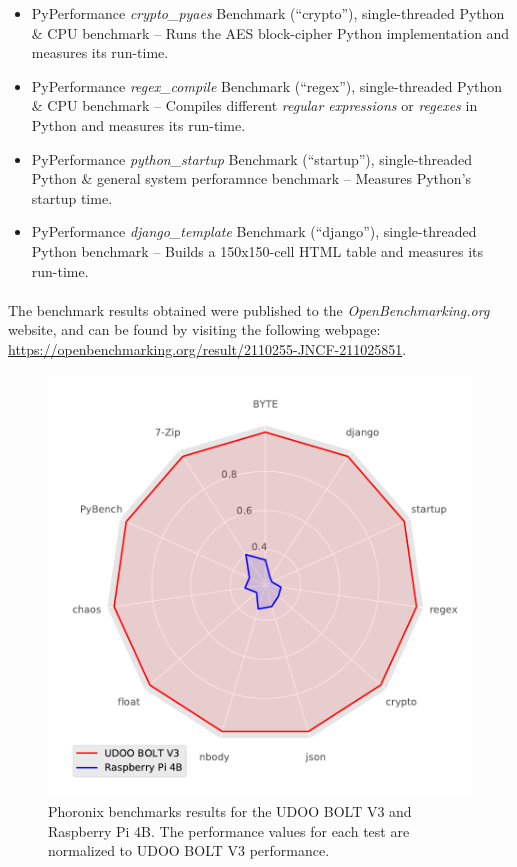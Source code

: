 \begin{itemize}
    \item PyPerformance \textit{crypto\_pyaes} Benchmark (``crypto''), single-threaded Python \& CPU benchmark -- Runs the AES block-cipher Python implementation and measures its run-time.
    \item PyPerformance \textit{regex\_compile} Benchmark (``regex''), single-threaded Python \& CPU benchmark -- Compiles different \textit{regular expressions} or \textit{regexes} in Python and measures its run-time.
    \item PyPerformance \textit{python\_startup} Benchmark (``startup''), single-threaded Python \& general system perforamnce benchmark -- Measures Python's startup time.
    \item PyPerformance \textit{django\_template} Benchmark (``django''), single-threaded Python benchmark -- Builds a 150x150-cell HTML table and measures its run-time.
\end{itemize}

\paragraph{} The benchmark results obtained were published to the \textit{OpenBenchmarking.org} website, and can be found by visiting the following webpage: \url{https://openbenchmarking.org/result/2110255-JNCF-211025851}.
\begin{figure}[H]
    \centering
    \includegraphics[width=0.8 \linewidth]{images/phoronix-benchmarks.pdf}
    \caption [Phoronix benchmarks results for the UDOO BOLT V3 and Raspberry Pi 4B.]{ Phoronix benchmarks results for the UDOO BOLT V3 and Raspberry Pi 4B. The performance values for each test are normalized to UDOO BOLT V3 performance.}
    \label{fig:phronix-benchmarks}
\end{figure}

